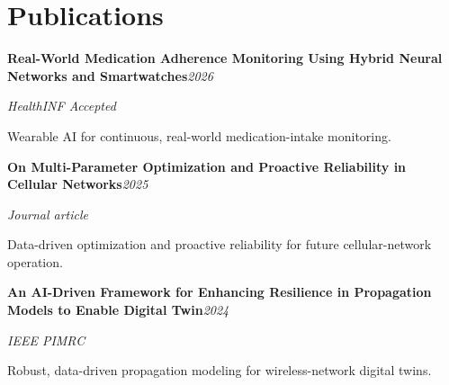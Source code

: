 \documentclass[9pt,letterpaper]{extarticle}
\newcommand{\entry}[2]{\Needspace{4\baselineskip}\textbf{#1}\hfill\textit{#2}\par}
\begin{document}
\section{Publications}
\entry{Real-World Medication Adherence Monitoring Using Hybrid Neural Networks and Smartwatches}{2026}
\textit{HealthINF \textbar{} Accepted}\par
Wearable AI for continuous, real-world medication-intake monitoring.\par
\entry{On Multi-Parameter Optimization and Proactive Reliability in Cellular Networks}{2025}
\textit{Journal article}\par
Data-driven optimization and proactive reliability for future cellular-network operation.\par
\entry{An AI-Driven Framework for Enhancing Resilience in Propagation Models to Enable Digital Twin}{2024}
\textit{IEEE PIMRC}\par
Robust, data-driven propagation modeling for wireless-network digital twins.\par
\end{document}
